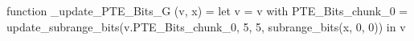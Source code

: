function _update_PTE_Bits_G (v, x) = let v = { v with PTE_Bits_chunk_0 = update_subrange_bits(v.PTE_Bits_chunk_0, 5, 5, subrange_bits(x, 0, 0)) } in
  v
